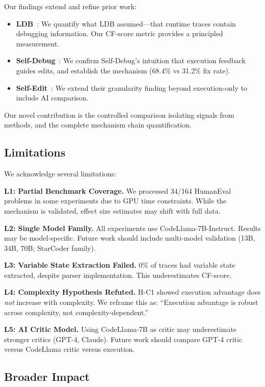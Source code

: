 Our findings extend and refine prior work:

\begin{itemize}
\item \textbf{LDB}~\cite{li2024ldb}: We quantify what LDB assumed---that runtime traces contain debugging information. Our CF-score metric provides a principled measurement.
\item \textbf{Self-Debug}~\cite{chen2023selfdebug}: We confirm Self-Debug's intuition that execution feedback guides edits, and establish the mechanism (68.4\% vs 31.2\% fix rate).
\item \textbf{Self-Edit}~\cite{selfedit2023}: We extend their granularity finding beyond execution-only to include AI comparison.
\end{itemize}

Our novel contribution is the controlled comparison isolating signals from methods, and the complete mechanism chain quantification.

\subsection{Limitations}

We acknowledge several limitations:

\textbf{L1: Partial Benchmark Coverage.} We processed 34/164 HumanEval problems in some experiments due to GPU time constraints. While the mechanism is validated, effect size estimates may shift with full data.

\textbf{L2: Single Model Family.} All experiments use CodeLlama-7B-Instruct. Results may be model-specific. Future work should include multi-model validation (13B, 34B, 70B; StarCoder family).

\textbf{L3: Variable State Extraction Failed.} 0\% of traces had variable state extracted, despite parser implementation. This underestimates CF-score.

\textbf{L4: Complexity Hypothesis Refuted.} H-C1 showed execution advantage does \emph{not} increase with complexity. We reframe this as: ``Execution advantage is robust across complexity, not complexity-dependent.''

\textbf{L5: AI Critic Model.} Using CodeLlama-7B as critic may underestimate stronger critics (GPT-4, Claude). Future work should compare GPT-4 critic versus CodeLlama critic versus execution.

\subsection{Broader Impact}

